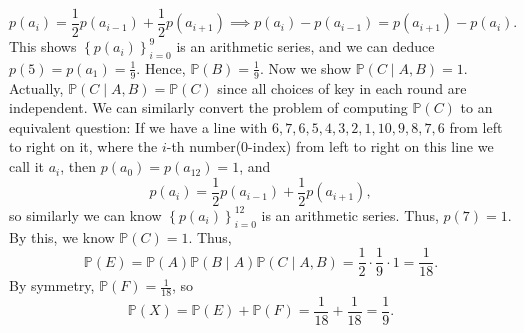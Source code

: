 \documentclass[a4paper,12pt]{article}
\begin{document}
\[
	p(a_i) = \frac{1}{2} p(a_{i-1}) + \frac{1}{2} p(a_{i+1}) \implies p(a_i) - p(a_{i-1}) = p(a_{i+1}) - p(a_i).
\]          
This shows \(\left\{ p(a_i) \right\}_{i=0}^{9} \) is an arithmetic series, and we can deduce \(p(5) = p(a_1) = \frac{1}{9}\). Hence, \(\mathbb{P} (B) = \frac{1}{9}\). Now we show \(\mathbb{P} (C \mid A, B) = 1\). Actually, \(\mathbb{P} (C \mid A, B) = \mathbb{P} (C)\) since all choices of key in each round are independent. We can similarly convert the problem of computing \(\mathbb{P} (C)\) to an equivalent question: If we have a line with \(6, 7, 6, 5, 4, 3, 2, 1, 10, 9, 8, 7 , 6\) from left to right on it, where the \(i\)-th number(0-index) from left to right on this line we call it \(a_i\), then \(p(a_0) = p(a_{12}) = 1\), and 
\[
	p(a_i) = \frac{1}{2} p(a_{i-1}) + \frac{1}{2} p(a_{i+1}),
\]           
so similarly we can know \(\left\{ p(a_i) \right\}_{i=0}^{12} \) is an arithmetic series. Thus, \(p(7) = 1\). By this, we know \(\mathbb{P} (C) = 1\). Thus, 
\[
	\mathbb{P} (E) = \mathbb{P} (A) \mathbb{P} (B \mid A) \mathbb{P} (C \mid A, B) = \frac{1}{2} \cdot \frac{1}{9} \cdot 1 = \frac{1}{18}.
\]   
By symmetry, \(\mathbb{P} (F) = \frac{1}{18}\), so 
\[
	\mathbb{P} (X) = \mathbb{P} (E) + \mathbb{P} (F) = \frac{1}{18} + \frac{1}{18} = \frac{1}{9}.
\] 
\end{document}
